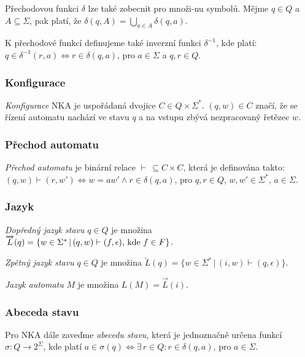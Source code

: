         Přechodovou funkci $\delta$ lze také zobecnit pro množi-nu symbolů. Mějme $q \in Q$ a $A \subseteq \Sigma$, pak platí, že $\delta(q, A) = \bigcup_{a\in A} \delta(q, a)$.

        K přechodové funkcí definujeme také inverzní funkci $\delta^{-1}$, kde platí: $q \in \delta^{-1}(r, a) \iff r \in \delta(q, a)$, pro $a \in \Sigma$ a $q, r \in Q$.

        \subsubsection*{Konfigurace}
            \textit{Konfigurace} NKA je uspořádaná dvojice $C \in Q \times \Sigma^*$. $(q, w) \in C$ značí, že se řízení automatu nachází ve stavu $q$ a na vstupu zbývá nezpracovaný řetězec $w$.

        \subsubsection*{Přechod automatu}
            \textit{Přechod automatu} je binární relace $\vdash\, \subseteq C \times C$, která je definována takto: $(q, w) \vdash (r, w') \iff w = aw' \land r \in \delta(q, a)$, pro $q, r \in Q$, $w, w' \in \Sigma^*$, $a \in \Sigma$.

        \subsubsection*{Jazyk}
            \textit{Dopředný jazyk stavu} $q \in Q$ je množina $\overrightarrow L(q) = \{w \in \Sigma^*\, |\, (q, w) \vdash (f, \epsilon)\textnormal{, kde }f \in F\}$.

            \noindent\textit{Zpětný jazyk stavu} $q \in Q$ je množina $\overleftarrow L(q) = \{w \in \Sigma^*\, |\, (i, w) \vdash (q, \epsilon)\}$.

            \noindent\textit{Jazyk automatu} $M$ je množina $L(M) = \overrightarrow L(i)$.

        \subsubsection*{Abeceda stavu}
            Pro NKA dále zaveďme \textit{abecedu stavu}, která je jednoznačně určena funkcí $\sigma : Q \rightarrow 2^\Sigma$, kde platí $a \in \sigma(q) \iff \exists\,r \in Q: r \in \delta(q, a)$, pro $a \in \Sigma$.


